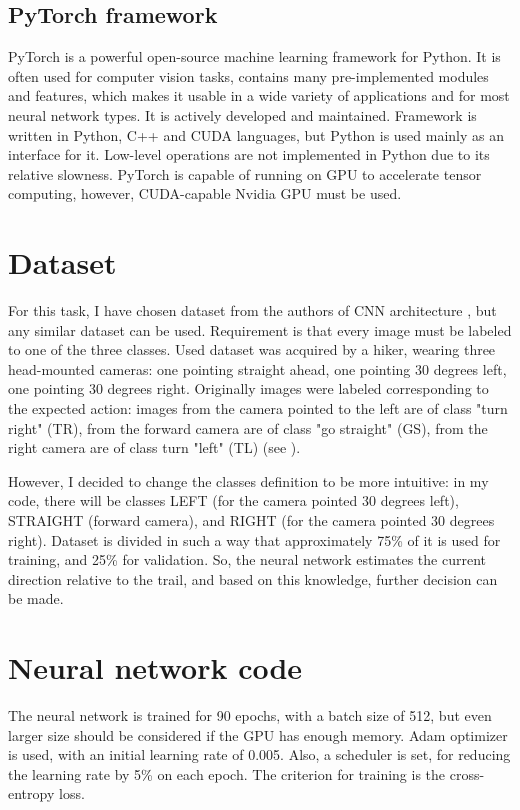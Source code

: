 \subsection{PyTorch framework}

PyTorch is a powerful open-source machine learning framework for Python. It is often used for computer vision tasks, contains many pre-implemented modules and features, which makes it usable in a wide variety of applications and for most neural network types. It is actively developed and maintained. Framework is written in Python, C++ and CUDA languages, but Python is used mainly as an interface for it. Low-level operations are not implemented in Python due to its relative slowness. PyTorch is capable of running on \acs{GPU} to accelerate tensor computing, however, CUDA-capable Nvidia \acs{GPU} must be used. 


\section{Dataset}

For this task, I have chosen dataset from the authors of \acs{CNN} architecture \cite{giusti2016machine}, but any similar dataset can be used. Requirement is that every image must be labeled to one of the three classes. Used dataset was acquired by a hiker, wearing three head-mounted cameras: one pointing straight ahead, one pointing 30 degrees left, one pointing 30 degrees right. Originally images were labeled corresponding to the expected action: images from the camera pointed to the left are of class "turn right" (TR), from the forward camera are of class "go straight" (GS), from the right camera are of class turn "left" (TL) (see ).

However, I decided to change the classes definition to be more intuitive: in my code, there will be classes LEFT (for the camera pointed 30 degrees left), STRAIGHT (forward camera), and RIGHT (for the camera pointed 30 degrees right). Dataset is divided in such a way that approximately 75\% of it is used for training, and 25\% for validation. So, the neural network estimates the current direction relative to the trail, and based on this knowledge, further decision can be made.

\section{Neural network code}

The neural network is trained for 90 epochs, with a batch size of 512, but even larger size should be considered if the GPU has enough memory. Adam optimizer is used, with an initial learning rate of 0.005. Also, a scheduler is set, for reducing the learning rate by 5\% on each epoch. The criterion for training is the cross-entropy loss. 

